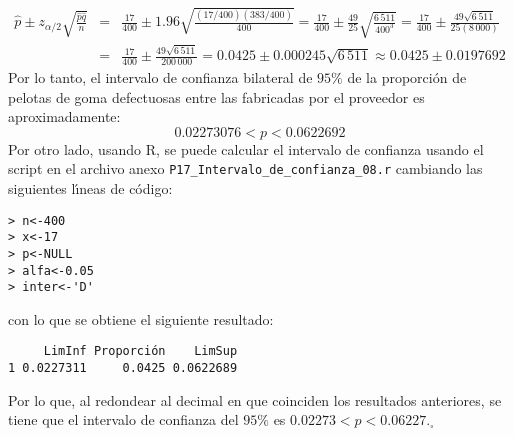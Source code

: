 \begin{solucion}
\begin{enumerate}
\begin{eqnarray*}
   \hat{p} \pm z_{\alpha/2}\sqrt{\frac{\hat{p}\hat{q}}{n}} & = & \frac{17}{400} \pm 1.96\sqrt{\frac{(17/400)(383/400)}{400}} = \frac{17}{400} \pm \frac{49}{25} \sqrt{\frac{6\,511}{400^3}} = \frac{17}{400} \pm \frac{49\sqrt{6\,511}}{25(8\,000)} \\
   & = & \frac{17}{400} \pm \frac{49\sqrt{6\,511}}{200\,000} = 0.0425 \pm 0.000245\sqrt{6\,511} \approx 0.0425 \pm 0.0197692
  \end{eqnarray*}
  Por lo tanto, el intervalo de confianza bilateral de $95\%$ de la proporci\'on de pelotas de goma defectuosas entre las fabricadas por el proveedor es aproximadamente:
  \begin{equation*}
   0.02273076 < p < 0.0622692
  \end{equation*}
  Por otro lado, usando R, se puede calcular el intervalo de confianza usando el script en el archivo anexo \texttt{P17\_Intervalo\_de\_confianza\_08.r} cambiando las siguientes l\'{\i}neas de c\'odigo:
  \begin{verbatim}
> n<-400
> x<-17
> p<-NULL
> alfa<-0.05
> inter<-'D'
  \end{verbatim}
  \vspace{-0.5cm}
  con lo que se obtiene el siguiente resultado:
  \begin{verbatim}
     LimInf Proporción    LimSup
1 0.0227311     0.0425 0.0622689
  \end{verbatim}
  \vspace{-0.5cm}
  Por lo que, al redondear al decimal en que coinciden los resultados anteriores, se tiene que el intervalo de confianza del $95\%$ es $0.02273 < p < 0.06227$.${}_{\square}$
  

\end{enumerate}
\end{solucion}
